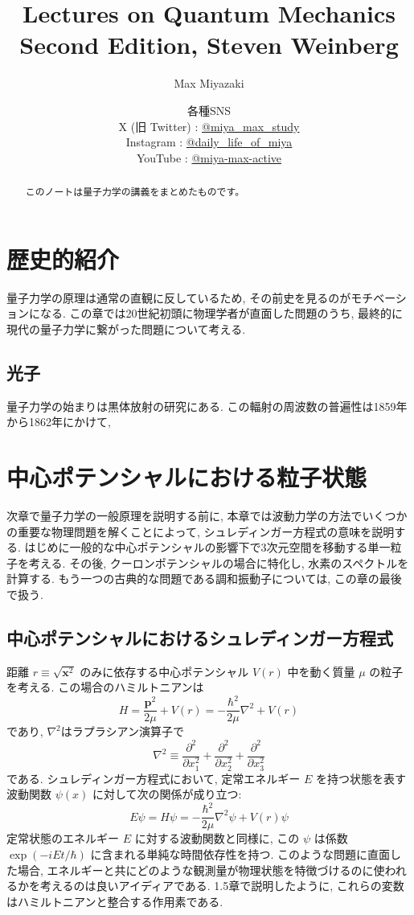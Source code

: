 \documentclass[12pt]{jsbook}
\title{ Lectures on Quantum Mechanics\\
Second Edition, Steven Weinberg }
\date{各種SNS\\
    X (旧 Twitter) : \href{https://x.com/miya_max_study}{@miya\_max\_study}\\
    Instagram : \href{https://www.instagram.com/daily_life_of_miya/}{@daily\_life\_of\_miya}\\
    YouTube : \href{https://www.youtube.com/@miya-max-active}{@miya-max-active}
    }
\author{Max Miyazaki}
\numberwithin{equation}{section}
\begin{document}
\maketitle
\vspace{1cm}
\begin{abstract}
    このノートは量子力学の講義をまとめたものです。
\end{abstract}

\newpage
\tableofcontents
\newpage
\chapter{歴史的紹介}
量子力学の原理は通常の直観に反しているため, その前史を見るのがモチベーションになる. この章では20世紀初頭に物理学者が直面した問題のうち, 最終的に現代の量子力学に繋がった問題について考える.

\section{光子}
量子力学の始まりは黒体放射の研究にある. この輻射の周波数の普遍性は1859年から1862年にかけて, 

\chapter{中心ポテンシャルにおける粒子状態}
次章で量子力学の一般原理を説明する前に, 本章では波動力学の方法でいくつかの重要な物理問題を解くことによって, シュレディンガー方程式の意味を説明する. はじめに一般的な中心ポテンシャルの影響下で3次元空間を移動する単一粒子を考える. その後, クーロンポテンシャルの場合に特化し, 水素のスペクトルを計算する. もう一つの古典的な問題である調和振動子については, この章の最後で扱う.
\section{中心ポテンシャルにおけるシュレディンガー方程式}
距離 $r \equiv\sqrt{\bm{x}^2}$ のみに依存する中心ポテンシャル $V(r)$ 中を動く質量 $\mu$ の粒子を考える. この場合のハミルトニアンは
\begin{equation*}
    H = \frac{\bm{p}^2}{2\mu} + V(r) = - \frac{\hbar^2}{2\mu} \nabla^2 + V(r)\tag{2.1.1}
\end{equation*}
であり, $\nabla^2$はラプラシアン演算子で
\begin{equation*}
    \nabla^2 \equiv \frac{\partial^2}{\partial x_1^2} + \frac{\partial^2}{\partial x_2^2} + \frac{\partial^2}{\partial x_3^2}\tag{2.1.2}
\end{equation*}
である. シュレディンガー方程式において, 定常エネルギー $E$ を持つ状態を表す波動関数 $\psi(x)$ に対して次の関係が成り立つ:
\begin{equation*}
    E\psi = H\psi = - \frac{\hbar^2}{2\mu} \nabla^2 \psi + V(r)\psi \tag{2.1.3}
\end{equation*}
定常状態のエネルギー $E$ に対する波動関数と同様に, この $\psi$ は係数 $\exp(-iEt/\hbar)$ に含まれる単純な時間依存性を持つ. このような問題に直面した場合, エネルギーと共にどのような観測量が物理状態を特徴づけるのに使われるかを考えるのは良いアイディアである. 1.5章で説明したように, これらの変数はハミルトニアンと整合する作用素である.
\end{document}
